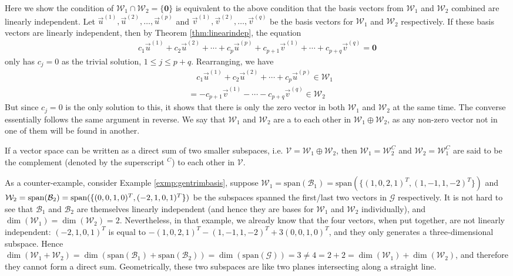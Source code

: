 Here we show the condition of $\mathcal{W}_1 \cap \mathcal{W}_2 = \{\textbf{0}\}$ is equivalent to the above condition that the basis vectors from $\mathcal{W}_1$ and $\mathcal{W}_2$ combined are linearly independent. Let $\vec{u}^{(1)}, \vec{u}^{(2)}, \ldots, \vec{u}^{(p)}$ and $\vec{v}^{(1)}, \vec{v}^{(2)}, \ldots, \vec{v}^{(q)}$ be the basis vectors for $\mathcal{W}_1$ and $\mathcal{W}_2$ respectively. If these basis vectors are linearly independent, then by Theorem \ref{thm:linearindep}, the equation
\begin{align*}
c_1\vec{u}^{(1)} + c_2\vec{u}^{(2)} + \cdots + c_p\vec{u}^{(p)} + c_{p+1}\vec{v}^{(1)} + \cdots + c_{p+q}\vec{v}^{(q)} = \textbf{0}
\end{align*}
only has $c_j = 0$ as the trivial solution, $1 \leq j \leq p+q$. Rearranging, we have
\begin{align*}
&\quad c_1\vec{u}^{(1)} + c_2\vec{u}^{(2)} + \cdots + c_p\vec{u}^{(p)} \in \mathcal{W}_1 \\
&= -c_{p+1}\vec{v}^{(1)} - \cdots - c_{p+q}\vec{v}^{(q)} \in \mathcal{W}_2
\end{align*}
But since $c_j = 0$ is the only solution to this, it shows that there is only the zero vector in both $\mathcal{W}_1$ and $\mathcal{W}_2$ at the same time. The converse essentially follows the same argument in reverse. We say that $\mathcal{W}_1$ and $\mathcal{W}_2$ are a  to each other in $\mathcal{W}_1 \oplus \mathcal{W}_2$, as any non-zero vector not in one of them will be found in another.
\begin{proper}[Complement]
\label{proper:complement}
If a vector space can be written as a direct sum of two smaller subspaces, i.e. $\mathcal{V} = \mathcal{W}_1 \oplus \mathcal{W}_2$, then $\mathcal{W}_1 = \mathcal{W}_2^C$ and $\mathcal{W}_2 = \mathcal{W}_1^C$ are said to be the complement (denoted by the superscript $^C$) to each other in $\mathcal{V}$.
\end{proper}
As a counter-example, consider Example \ref{exmp:gentrimbasis}, suppose $\mathcal{W}_1 = \text{span}(\mathcal{B}_1) = \text{span}(\{(1,0,2,1)^T, (1,-1,1,-2)^T\})$ and $\mathcal{W}_2 = \text{span}(\mathcal{B}_2) = \text{span}(\{(0,0,1,0)^T, \\(-2,1,0,1)^T\})$ be the subspaces spanned the first/last two vectors in $\mathcal{G}$ respectively. It is not hard to see that $\mathcal{B}_1$ and $\mathcal{B}_2$ are themselves linearly independent (and hence they are bases for $\mathcal{W}_1$ and $\mathcal{W}_2$ individually), and $\dim(\mathcal{W}_1) = \dim(\mathcal{W}_2) = 2$. Nevertheless, in that example, we already know that the four vectors, when put together, are not linearly independent: $(-2,1,0,1)^T$ is equal to $-(1,0,2,1)^T-(1,-1,1,-2)^T+3(0,0,1,0)^T$, and they only generates a three-dimensional subspace. Hence $\dim(\mathcal{W}_1 + \mathcal{W}_2) = \dim(\text{span}(\mathcal{B}_1) + \text{span}(\mathcal{B}_2)) = \dim(\text{span}(\mathcal{G})) = 3 \neq 4 = 2+2 = \dim(\mathcal{W}_1) + \dim(\mathcal{W}_2)$, and therefore they cannot form a direct sum. Geometrically, these two subspaces are like two planes intersecting along a straight line.\\
